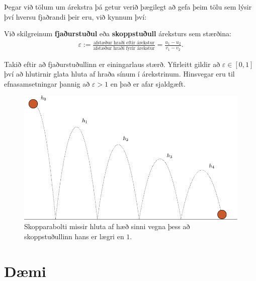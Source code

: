 \ifdefined \wholebook \else\documentclass[oneside]{book}\usepackage{EdlBook}\graphicspath{{figures/}}
\begin{document}
\vspace{0.2cm}

Þegar við tölum um árekstra þá getur verið þægilegt að gefa þeim tölu sem lýsir því hversu fjaðrandi þeir eru, við kynnum því:

\begin{tcolorbox}
\begin{definition}
Við skilgreinum \textbf{fjaðurstuðul} eða \textbf{skoppstuðull} áreksturs sem stærðina:
\begin{align*}
    \varepsilon := \frac{\text{afstæður hraði eftir árekstur}}{\text{afstæður hraði fyrir árekstur}} = \frac{u_1 - u_2}{v_1 - v_2}.
\end{align*}
\end{definition}
\end{tcolorbox}
Takið eftir að fjaðurstuðullinn er einingarlaus stærð. Yfirleitt gildir að $\varepsilon \in [0,1]$ því að hlutirnir glata hluta af hraða sínum í árekstrinum. Hinsvegar eru til efnasamsetningar þannig að $\varepsilon > 1$ en það er afar sjaldgæft.


\begin{figure}[H]
    \centering
    \includegraphics[scale = 0.8]{figures/skopparisimple.pdf}
    \caption{Skopparabolti missir hluta af hæð sinni vegna þess að skoppstuðullinn hans er lægri en $1$.}
    \label{fig:my_label}
\end{figure}


\newpage

\section{Dæmi}
\end{document}
